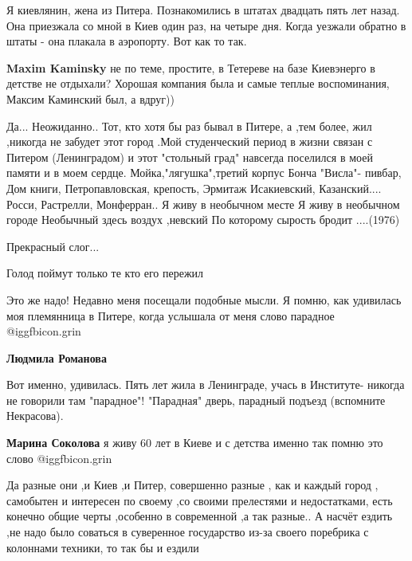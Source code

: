 \begin{itemize}

Я киевлянин, жена из Питера. Познакомились в штатах двадцать пять лет назад.
Она приезжала со мной в Киев один раз, на четыре дня. Когда уезжали обратно в
штаты - она плакала в аэропорту. Вот как то так.

\begin{itemize} %
\textbf{Maxim Kaminsky} не по теме, простите, в Тетереве на базе Киевэнерго в детстве не отдыхали? Хорошая компания была и самые теплые воспоминания, Максим Каминский был, а вдруг))
\end{itemize} %


Да... Неожиданно.. Тот, кто хотя бы раз бывал в Питере, а ,тем более, жил ,никогда
не забудет этот город .Мой студенческий период в жизни связан с Питером
(Ленинградом) и этот "стольный град" навсегда поселился в моей памяти и в моем
сердце. Мойка,"лягушка",третий корпус Бонча "Висла"- пивбар, Дом
книги, Петропавловская, крепость, Эрмитаж
Исакиевский, Казанский.... Росси, Растрелли, Монферран.. Я живу в необычном месте Я
живу в необычном городе Необычный здесь воздух ,невский По которому сырость
бродит ....(1976)


Прекрасный слог...

Голод поймут только те кто его пережил


Это же надо! Недавно меня посещали подобные мысли. Я помню, как удивилась моя
племянница в Питере, когда услышала от меня слово парадное @igg{fbicon.grin} 

\begin{itemize} %
\textbf{Людмила Романова}

Вот именно, удивилась. Пять лет жила в Ленинграде, учась в Институте- никогда не
говорили там "парадное"! "Парадная" дверь, парадный подъезд (вспомните
Некрасова).

\textbf{Марина Соколова} я живу 60 лет в Киеве и с детства именно так помню это слово @igg{fbicon.grin} 
\end{itemize} %


Да разные они ,и Киев ,и Питер, совершенно разные , как и каждый город ,
самобытен и интересен по своему ,со своими прелестями и недостатками, есть
конечно общие черты ,особенно в современной ,а так разные.. А насчёт ездить ,не
надо было соваться в суверенное государство из-за своего поребрика с колоннами
техники, то так бы и ездили


\end{itemize}

